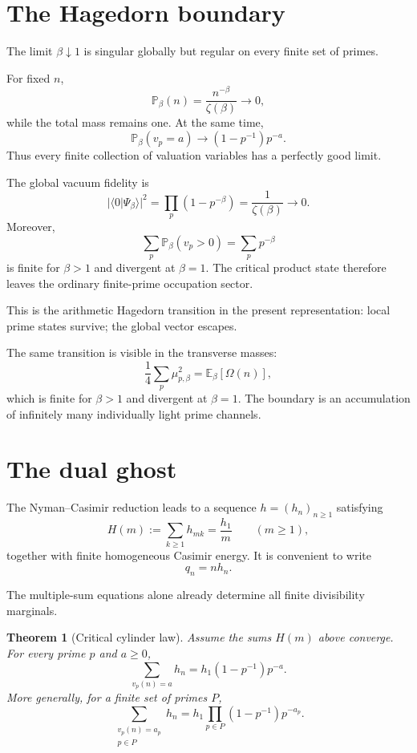 \documentclass[11pt]{article}
\newtheorem{theorem}{Theorem}[section]
\theoremstyle{definition}
\theoremstyle{remark}
\begin{document}
\section{The Hagedorn boundary}

The limit \(\beta\downarrow1\) is singular globally but regular on every finite set of primes.

For fixed \(n\),
\[
\mathbb P_\beta(n)
=
\frac{n^{-\beta}}{\zeta(\beta)}
\longrightarrow0,
\]
while the total mass remains one.  At the same time,
\[
\mathbb P_\beta(v_p=a)
\longrightarrow
(1-p^{-1})p^{-a}.
\]
Thus every finite collection of valuation variables has a perfectly good limit.

The global vacuum fidelity is
\[
|\langle0|\Psi_\beta\rangle|^2
=
\prod_p(1-p^{-\beta})
=
\frac1{\zeta(\beta)}
\longrightarrow0.
\]
Moreover,
\[
\sum_p\mathbb P_\beta(v_p>0)
=
\sum_p p^{-\beta}
\]
is finite for \(\beta>1\) and divergent at \(\beta=1\).  The critical product state therefore leaves the ordinary finite-prime occupation sector.

This is the arithmetic Hagedorn transition in the present representation: local prime states survive; the global vector escapes.

The same transition is visible in the transverse masses:
\[
\frac14\sum_p\mu_{p,\beta}^2
=
\mathbb E_\beta[\Omega(n)],
\]
which is finite for \(\beta>1\) and divergent at \(\beta=1\).  The boundary is an accumulation of infinitely many individually light prime channels.

\section{The dual ghost}

The Nyman--Casimir reduction leads to a sequence \(h=(h_n)_{n\ge1}\) satisfying
\[
\boxed{
H(m):=\sum_{k\ge1}h_{mk}
=
\frac{h_1}{m}
\qquad(m\ge1),
}
\]
together with finite homogeneous Casimir energy.  It is convenient to write
\[
q_n=nh_n.
\]

The multiple-sum equations alone already determine all finite divisibility marginals.

\begin{theorem}[Critical cylinder law]
Assume the sums \(H(m)\) above converge.  For every prime \(p\) and \(a\ge0\),
\[
\boxed{
\sum_{v_p(n)=a}h_n
=
h_1(1-p^{-1})p^{-a}.
}
\]
More generally, for a finite set of primes \(P\),
\[
\boxed{
\sum_{\substack{v_p(n)=a_p\\ p\in P}}h_n
=
h_1
\prod_{p\in P}(1-p^{-1})p^{-a_p}.
}
\]
\end{theorem}
\end{document}
